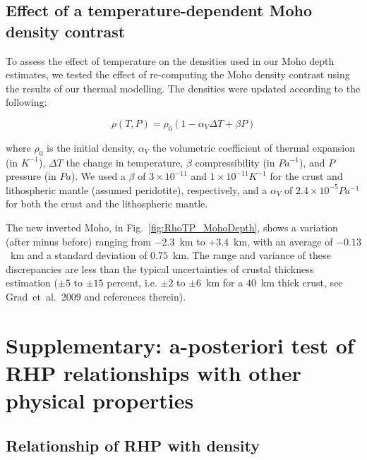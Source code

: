 {\begin{subappendices}
\FloatBarrier

\subsection{Effect of a temperature-dependent Moho density contrast}
\label{ss:ApplSup:MethodTests:MohoDeltaRho}

To assess the effect of temperature on the densities used in our Moho depth estimates, we tested the effect of re-computing the Moho density contrast using the results of our thermal modelling.
The densities were updated according to the following:

\begin{equation*}
    \rho(T,P) = \rho_0 (1 - \alpha_V \Delta T + \beta P) 
\end{equation*}

where $\rho_0$ is the initial density, $\alpha_V$ the volumetric coefficient of thermal expansion (in $K^{-1}$), $\Delta T$ the change in temperature, $\beta$ compressibility (in $Pa^{-1}$), and $P$ pressure (in $Pa$). We used a $\beta$ of $3 \times 10^{-11}$ and $1 \times 10^{-11} K^{-1}$ for the crust and lithospheric mantle (assumed peridotite), respectively, and a $\alpha_V$ of $2.4 \times 10^{-5} Pa^{-1}$ for both the crust and the lithospheric mantle.

The new inverted Moho, in Fig.~\ref{fig:RhoTP_MohoDepth}, shows a variation (after minus before) ranging from $-2.3$~km to $+3.4$~km, with an average of $-0.13$~km and a standard deviation of $0.75$~km. The range and variance of these discrepancies are less than the typical uncertainties of crustal thickness estimation ($\pm 5$ to $\pm 15$ percent, i.e. $\pm 2$ to $\pm 6$~km for a $40$~km thick crust, see Grad~et~al.~2009 and references therein).


\section[Supplementary:~a-posteriori test of RHP relationships with other physical properties]{Supplementary: a-posteriori test of RHP relationships with other physical properties}
\label{s:ApplSup:Rel}

\subsection{Relationship of RHP with density}
\label{ss:ApplSup:Rel:Rho}


\end{subappendices}}
